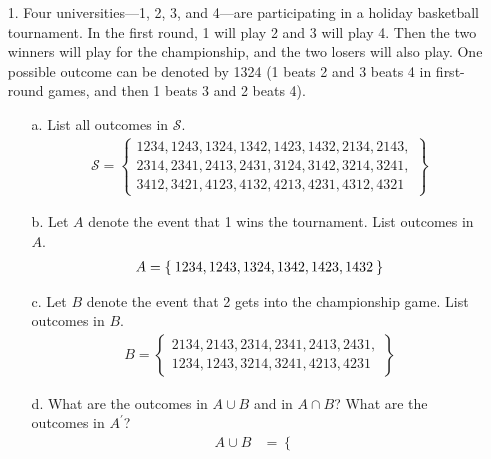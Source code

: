 \documentclass[letterpaper,12pt]{article}
\begin{document}
\maketitle

\begin{enumerate}
  \item[1.]
    Four universities---1, 2, 3, and 4---are participating in a holiday basketball tournament. In the first round, 1 will play 2 and 3 will play 4. Then the two winners will play for the championship, and the two losers will also play. One possible outcome can be denoted by 1324 (1 beats 2 and 3 beats 4 in first-round games, and then 1 beats 3 and 2 beats 4).
    \begin{enumerate}
      \item[a.]
        List all outcomes in $\mathcal{S}$.
        \begin{align*}
          \mathcal{S} =
          \left\{\begin{array}{l}
            1234, 1243, 1324, 1342, 1423, 1432, 2134, 2143, \\
            2314, 2341, 2413, 2431, 3124, 3142, 3214, 3241, \\
            3412, 3421, 4123, 4132, 4213, 4231, 4312, 4321
          \end{array}\right\}
        \end{align*}
      \item[b.]
        Let $A$ denote the event that 1 wins the tournament. List outcomes in $A$.
        \begin{align*}
          A = \Set{1234, 1243, 1324, 1342, 1423, 1432}
        \end{align*}
      \item[c.]
        Let $B$ denote the event that 2 gets into the championship game. List outcomes in $B$.
        \begin{align*}
          B =
          \left\{\begin{array}{l}
            2134, 2143, 2314, 2341, 2413, 2431, \\
            1234, 1243, 3214, 3241, 4213, 4231
          \end{array}\right\}
        \end{align*}
      \item[d.]
        What are the outcomes in $A \cup B$ and in $A \cap B$? What are the outcomes in $A^\prime$?
        \begin{align*}
          A \cup B &=
          \left\{\begin{array}{l}

\end{array}
\end{align*}
\end{enumerate}
\end{enumerate}
\end{document}
